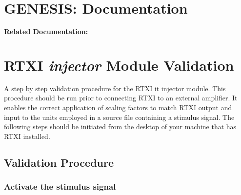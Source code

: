 \documentclass[12pt]{article}
\begin{document}
\section*{GENESIS: Documentation}

{\bf Related Documentation:}

\section*{RTXI {\it injector} Module Validation}

A step by step validation procedure for the RTXI {it injector} module. This procedure should be run prior to connecting RTXI to an external amplifier. It enables the correct application of scaling factors to match RTXI output and input to the units employed in a source file containing a stimulus signal. The following steps should be initiated from the desktop of your machine that has RTXI installed. 

\subsection*{Validation Procedure}

\subsubsection*{Activate the stimulus signal}
\end{document}
